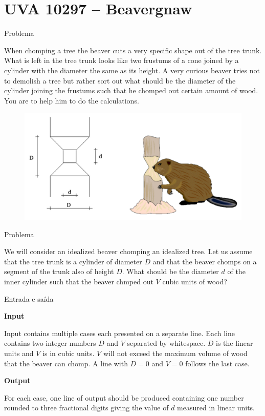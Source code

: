 \section{UVA 10297 -- Beavergnaw}

\begin{frame}[fragile]{Problema}

When chomping a tree the beaver cuts a very specific shape out of the tree trunk. What is left in
the tree trunk looks like two frustums of a cone joined by a cylinder with the diameter the same as
its height. A very curious beaver tries not to demolish a tree but rather sort out what should be the
diameter of the cylinder joining the frustums such that he chomped out certain amount of wood. You
are to help him to do the calculations.

\begin{figure}
    \centering

    \includegraphics[scale=0.5]{10297.png}
\end{figure}

\end{frame}

\begin{frame}[fragile]{Problema}

We will consider an idealized beaver chomping an idealized tree. Let us assume that the tree trunk
is a cylinder of diameter $D$ and that the beaver chomps on a segment of the trunk also of height $D$.
What should be the diameter $d$ of the inner cylinder such that the beaver chmped out $V$ cubic units of wood?

\end{frame}

\begin{frame}[fragile]{Entrada e saída}

\textbf{Input}

Input contains multiple cases each presented on a separate line. Each line contains two integer 
numbers $D$ and $V$ separated by whitespace. $D$ is the linear units and $V$ is in cubic units. 
$V$ will not exceed the maximum volume of wood that the beaver can chomp. A line with $D = 0$ and 
$V = 0$ follows the last case.

\textbf{Output}

For each case, one line of output should be produced containing one number rounded to three 
fractional digits giving the value of $d$ measured in linear units.  

\end{frame}

